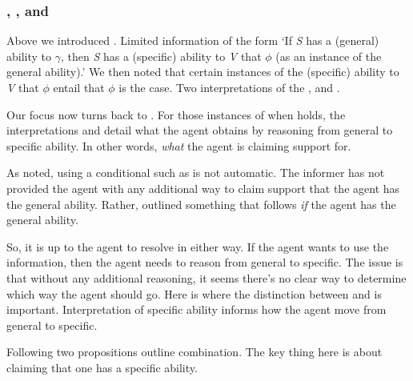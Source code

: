 \subsubsection{\AR{}, \WR{}, and \gsi{}}
\label{sec:ar-wr-gsi}

\begin{note}[Summarising]
  Above we introduced \gsi{}.
  Limited information of the form `If \emph{S} has a (general) ability to \(\gamma\), then \emph{S} has a (specific) ability to \emph{V} that \(\phi\) (as an instance of the general ability).'
  We then noted that certain instances of the (specific) ability to \emph{V} that \(\phi\) entail that \(\phi\) is the case.
  Two interpretations of the \aben{}, \AR{} and \WR{}.

  Our focus now turns back to \gsi{}.
  For those instances of \gsi{} when \aben{} holds, the interpretations \AR{} and \WR{} detail what the agent obtains by reasoning from general to specific ability.
  In other words, \emph{what} the agent is claiming support for.

  As noted, using a conditional such as \gsi{} is not automatic.
  The informer has not provided the agent with any additional way to claim support that the agent has the general ability.
  Rather, outlined something that follows \emph{if} the agent has the general ability.

  So, it is up to the agent to resolve in either way.
  If the agent wants to use the information, then the agent needs to reason from general to specific.
  The issue is that without any additional reasoning, it seems there's no clear way to determine which way the agent should go.
  Here is where the distinction between \AR{} and \WR{} is important.
  Interpretation of specific ability informs how the agent move from general to specific.

  Following two propositions outline combination.
  {
    \color{red}
    The key thing here is about claiming that one has a specific ability.
  }
\end{note}


